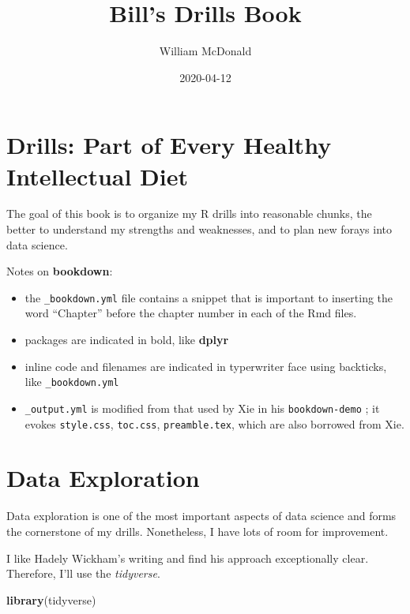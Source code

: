 \documentclass[]{book}
\title{Bill's Drills Book}
\author{William McDonald}
\date{2020-04-12}
\newenvironment{Shaded}{\begin{snugshade}}{\end{snugshade}}
\newcommand{\KeywordTok}[1]{\textcolor[rgb]{0.13,0.29,0.53}{\textbf{#1}}}
\newcommand{\NormalTok}[1]{#1}
\providecommand{\tightlist}{%
  \setlength{\itemsep}{0pt}\setlength{\parskip}{0pt}}
\begin{document}
\maketitle

{
\setcounter{tocdepth}{1}
\tableofcontents
}
\hypertarget{intro}{%
\chapter{Drills: Part of Every Healthy Intellectual Diet}\label{intro}}

The goal of this book is to organize my R drills into reasonable chunks, the better to understand my strengths and weaknesses, and to plan new forays into data science.

Notes on \textbf{bookdown}:

\begin{itemize}
\tightlist
\item
  the \texttt{\_bookdown.yml} file contains a snippet that is important to inserting the word ``Chapter'' before the chapter number in each of the Rmd files.
\item
  packages are indicated in bold, like \textbf{dplyr}
\item
  inline code and filenames are indicated in typerwriter face using backticks, like \texttt{\_bookdown.yml}
\item
  \texttt{\_output.yml} is modified from that used by Xie in his \texttt{bookdown-demo} \citep{R-bookdown}; it evokes \texttt{style.css}, \texttt{toc.css}, \texttt{preamble.tex}, which are also borrowed from Xie.
\end{itemize}

\hypertarget{dataexploration}{%
\chapter{Data Exploration}\label{dataexploration}}

Data exploration is one of the most important aspects of data science and forms the cornerstone of my drills. Nonetheless, I have lots of room for improvement.

I like Hadely Wickham's writing and find his approach exceptionally clear. Therefore, I'll use the \emph{tidyverse}.

\begin{Shaded}
\begin{Highlighting}[]
\KeywordTok{library}\NormalTok{(tidyverse)}
\end{Highlighting}
\end{Shaded}
\end{document}
